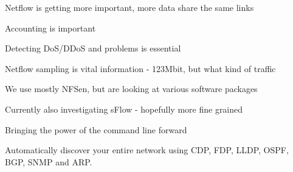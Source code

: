 \documentclass[Screen16to9,17pt]{foils}
\begin{document}





\begin{slidelist}
\item Netflow is getting more important, more data share the same links
\item Accounting is important
\item Detecting DoS/DDoS and problems is essential
\item Netflow sampling is vital information - 123Mbit, but what kind of traffic
\item We use mostly NFSen, but are looking at various software packages
\item Currently also investigating sFlow - hopefully more fine grained
\end{slidelist}





\centerline{Bringing the power of the command line forward}



Automatically discover your entire network using CDP, FDP, LLDP, OSPF, BGP, SNMP and ARP.







\slidenext
\end{document}
